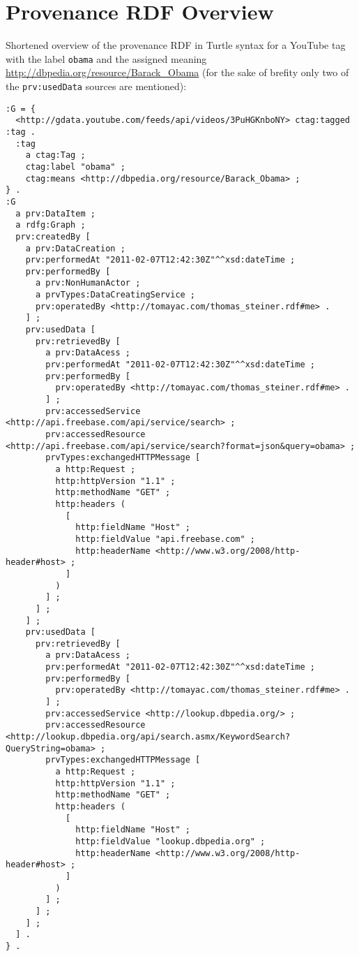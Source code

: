 \documentclass{acm_proc_article-sp}
\begin{document}
\section{Provenance RDF Overview}\label{sec:appendix}
Shortened overview of the provenance RDF in Turtle syntax for a YouTube tag with the label \texttt{obama} and the assigned meaning \url{http://dbpedia.org/resource/Barack_Obama} (for the sake of brefity only two of the \texttt{prv:usedData} sources are mentioned):
\begin{verbatim}
:G = {
  <http://gdata.youtube.com/feeds/api/videos/3PuHGKnboNY> ctag:tagged :tag .
  :tag
    a ctag:Tag ;
    ctag:label "obama" ;
    ctag:means <http://dbpedia.org/resource/Barack_Obama> ;
} .
:G
  a prv:DataItem ;
  a rdfg:Graph ;
  prv:createdBy [
    a prv:DataCreation ;
    prv:performedAt "2011-02-07T12:42:30Z"^^xsd:dateTime ;
    prv:performedBy [
      a prv:NonHumanActor ;
      a prvTypes:DataCreatingService ;
      prv:operatedBy <http://tomayac.com/thomas_steiner.rdf#me> .
    ] ;
    prv:usedData [
      prv:retrievedBy [
        a prv:DataAcess ;
        prv:performedAt "2011-02-07T12:42:30Z"^^xsd:dateTime ;
        prv:performedBy [
          prv:operatedBy <http://tomayac.com/thomas_steiner.rdf#me> .
        ] ;
        prv:accessedService <http://api.freebase.com/api/service/search> ;
        prv:accessedResource <http://api.freebase.com/api/service/search?format=json&query=obama> ;
        prvTypes:exchangedHTTPMessage [
          a http:Request ;
          http:httpVersion "1.1" ;
          http:methodName "GET" ;
          http:headers (
            [
              http:fieldName "Host" ;
              http:fieldValue "api.freebase.com" ;
              http:headerName <http://www.w3.org/2008/http-header#host> ;
            ]
          )
        ] ;
      ] ;
    ] ;
    prv:usedData [
      prv:retrievedBy [
        a prv:DataAcess ;
        prv:performedAt "2011-02-07T12:42:30Z"^^xsd:dateTime ;
        prv:performedBy [
          prv:operatedBy <http://tomayac.com/thomas_steiner.rdf#me> .
        ] ;
        prv:accessedService <http://lookup.dbpedia.org/> ;
        prv:accessedResource <http://lookup.dbpedia.org/api/search.asmx/KeywordSearch?QueryString=obama> ;
        prvTypes:exchangedHTTPMessage [
          a http:Request ;
          http:httpVersion "1.1" ;
          http:methodName "GET" ;
          http:headers (
            [
              http:fieldName "Host" ;
              http:fieldValue "lookup.dbpedia.org" ;
              http:headerName <http://www.w3.org/2008/http-header#host> ;
            ]
          )
        ] ;
      ] ;
    ] ;
  ] .
} .
\end{verbatim}

\balancecolumns
\end{document}
